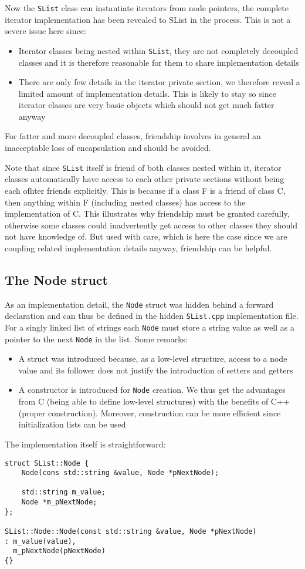Now the \lstinline!SList! class can instantiate iterators from node pointers, the complete iterator implementation has been revealed to SList in the process. This is not a severe issue here since:
\begin{itemize}
\item Iterator classes being nested within \lstinline!SList!, they are not completely decoupled classes and it is therefore reasonable for them to share implementation details
\item There are only few details in the iterator private section, we therefore reveal a limited amount of implementation details. This is likely to stay so since iterator classes are very basic objects which should not get much fatter anyway
\end{itemize}
For fatter and more decoupled classes, friendship involves in general an inacceptable loss of encapsulation and should be avoided.

Note that since \lstinline!SList! itself is friend of both classes nested within it, iterator classes automatically have access to each other private sections without being each ofhter friends explicitly. This is because if a class F is a friend of class C, then anything within F (including nested classes) has access to the implementation of C. This illustrates why friendship must be granted carefully, otherwise some classes could inadvertently get access to other classes they should not have knowledge of. But used with care, which is here the case since we are coupling related implementation details anyway, friendship can be helpful.

\subsection{The Node struct}
As an implementation detail, the \lstinline!Node! struct was hidden behind a forward declaration and can thus be defined in the hidden \lstinline!SList.cpp! implementation file. For a singly linked list of strings each \lstinline!Node! must store a string value as well as a pointer to the next \lstinline!Node! in the list. Some remarks:
\begin{itemize}
\item A struct was introduced because, as a low-level structure, access to a node value and its follower does not justify the introduction of setters and getters
\item A constructor is introduced for \lstinline!Node! creation. We thus get the advantages from C (being able to define low-level structures) with the benefits of C++ (proper construction). Moreover, construction can be more efficient since initialization lists can be used
\end{itemize}
The implementation itself is straightforward:
\begin{lstlisting}[frame=single, caption={SList.cpp}]
struct SList::Node {
    Node(cons std::string &value, Node *pNextNode);
    
    std::string m_value;
    Node *m_pNextNode;
};

SList::Node::Node(const std::string &value, Node *pNextNode)
: m_value(value),
  m_pNextNode(pNextNode)
{}
\end{lstlisting}

